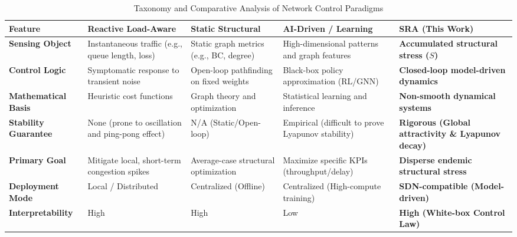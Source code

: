 \documentclass{ccjnl}
\begin{document}
\begin{table}[h!]
\centering
\caption{Taxonomy and Comparative Analysis of Network Control Paradigms}
\label{tab:related_work_comparison}
\renewcommand{\arraystretch}{1.3}
\small
\begin{tabularx}{\textwidth}{|l|X|X|X|X|}
\hline
\textbf{Feature} & \textbf{Reactive Load-Aware} & \textbf{Static Structural} & \textbf{AI-Driven / Learning} & \textbf{SRA (This Work)} \\
\hline \hline
\textbf{Sensing Object} & Instantaneous traffic (e.g., queue length, loss) & Static graph metrics (e.g., BC, degree) & High-dimensional patterns and graph features & \textbf{Accumulated structural stress ($S$)} \\
\hline
\textbf{Control Logic} & Symptomatic response to transient noise & Open-loop pathfinding on fixed weights & Black-box policy approximation (RL/GNN) & \textbf{Closed-loop model-driven dynamics} \\
\hline
\textbf{Mathematical Basis} & Heuristic cost functions & Graph theory and optimization & Statistical learning and inference & \textbf{Non-smooth dynamical systems} \\
\hline
\textbf{Stability Guarantee} & None (prone to oscillation and ping-pong effect) & N/A (Static/Open-loop) & Empirical (difficult to prove Lyapunov stability) & \textbf{Rigorous (Global attractivity \& Lyapunov decay)} \\
\hline
\textbf{Primary Goal} & Mitigate local, short-term congestion spikes & Average-case structural optimization & Maximize specific KPIs (throughput/delay) & \textbf{Disperse endemic structural stress} \\
\hline
\textbf{Deployment Mode} & Local / Distributed & Centralized (Offline) & Centralized (High-compute training) & \textbf{SDN-compatible (Model-driven)} \\
\hline
\textbf{Interpretability} & High & High & Low & \textbf{High (White-box Control Law)} \\
\hline
\end{tabularx}
\end{table}
\end{document}
